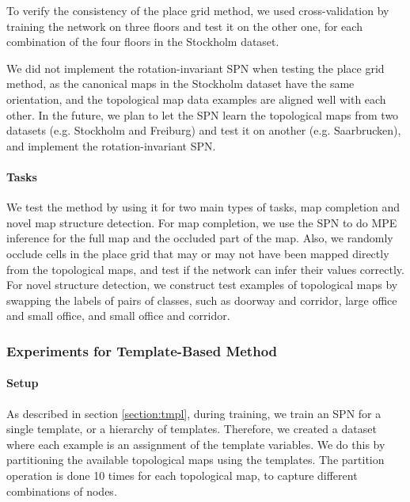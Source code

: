 \documentclass[10pt, titlepage]{article}
\theoremstyle{definition}
\begin{document}
To verify the consistency of the place grid method,  we used cross-validation by training the network on three floors and test it on the other one, for each combination of the four floors in the Stockholm dataset.

We did not implement the rotation-invariant SPN when testing the place grid method, as the canonical maps in the Stockholm dataset have the same orientation, and the topological map data examples are aligned well with each other. In the future, we plan to let the SPN learn the topological maps from two datasets (e.g. Stockholm and Freiburg) and test it on another (e.g. Saarbrucken), and implement the rotation-invariant SPN.

\paragraph{Tasks} We test the method by using it for two main types of tasks, map completion and novel map structure detection. For map completion, we use the SPN to do MPE inference for the full map and the occluded part of the map. Also, we randomly occlude cells in the place grid that may or may not have been mapped directly from the topological maps, and test if the network can infer their values correctly. For novel structure detection, we construct test examples of topological maps by swapping the labels of pairs of classes, such as doorway and corridor, large office and small office, and small office and corridor.

\subsubsection{Experiments for Template-Based Method}\label{section:exp-tmpl}

\paragraph{Setup} As described in section \ref{section:tmpl}, during training, we train an SPN for a single template, or a hierarchy of templates. Therefore, we created a dataset where each example is an assignment of the template variables. We do this by partitioning the available topological maps using the templates. The partition operation is done 10 times for each topological map, to capture different combinations of nodes.
\end{document}
